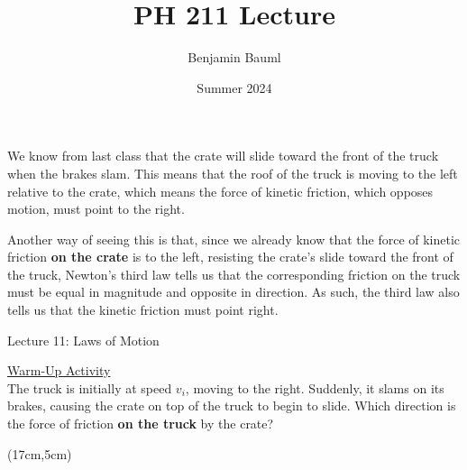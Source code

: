 \documentclass[]{article}
\title{PH 211 Lecture \Week}
\author{Benjamin Bauml}
\date{Summer 2024}
\newcommand{\Week}{11}
\begin{document}
\begin{TeacherMargin}
\noindent We know from last class that the crate will slide toward the front of the truck when the brakes slam. This means that the roof of the truck is moving to the left relative to the crate, which means the force of kinetic friction, which opposes motion, must point to the right.

Another way of seeing this is that, since we already know that the force of kinetic friction \textbf{on the crate} is to the left, resisting the crate's slide toward the front of the truck, Newton's third law tells us that the corresponding friction on the truck must be equal in magnitude and opposite in direction. As such, the third law also tells us that the kinetic friction must point right.
\end{TeacherMargin}
\begin{PresentSpace}
\begin{center}
	\huge Lecture \Week: Laws of Motion
\end{center}
\vspace{0.5cm}
\underline{Warm-Up Activity} \\
The truck is initially at speed $v_{i}$, moving to the right. Suddenly, it slams on its brakes, causing the crate on top of the truck to begin to slide. Which direction is the force of friction \textbf{on the truck} by the crate?
\end{PresentSpace}
\begin{textblock*}{5cm}(17cm,5cm)
\centering
{}
\end{textblock*}
\newpage
\end{document}
